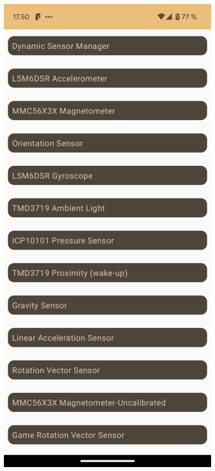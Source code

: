 \begin{figure}[h!]
    \centering
    \begin{minipage}[b]{.4\textwidth}
        \includegraphics[width=\textwidth]{figures/exercise-11-sensor-list.png}

\end{minipage}
\end{figure}
